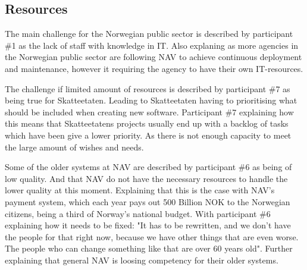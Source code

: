 

\subsection{Resources}
The main challenge for the Norwegian public sector is described by participant \#1 as the lack of staff with knowledge in IT. Also explaning as more agencies in the Norwegian public sector are following NAV to achieve continuous deployment and maintenance, however it requiring the agency to have their own IT-resources.


The challenge if limited amount of resources is described by participant \#7 as being true for Skatteetaten. Leading to Skatteetaten having to prioritising what should be included when creating new software. Participant \#7 explaining how this means that  Skatteetatens projects usually end up with a backlog of tasks which have been give a lower priority. As there is not enough capacity to meet the large amount of wishes and needs.


Some of the older systems at NAV are described by participant \#6 as being of low quality. And that NAV do not have the necessary resources to handle the lower quality at this moment. Explaining that this is the case with NAV's payment system, which each year pays out 500 Billion NOK to the Norwegian citizens, being a third of Norway's national budget. With participant \#6 explaining how it needs to be fixed: "It has to be rewritten, and we don't have the people for that right now, because we have other things that are even worse. The people who can change something like that are over 60 years old". Further explaining that general NAV is loosing competency for their older systems.


